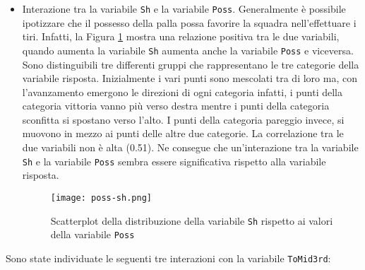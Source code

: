 \begin{itemize}
	\item Interazione tra la variabile \texttt{Sh} e la variabile \texttt{Poss}. Generalmente è possibile ipotizzare che il possesso della palla possa favorire la squadra nell’effettuare i tiri. Infatti, la Figura \ref{fig:shposs} mostra una relazione positiva tra le due variabili, quando aumenta la variabile \texttt{Sh} aumenta anche la variabile \texttt{Poss} e viceversa. Sono distinguibili tre differenti gruppi che rappresentano le tre categorie della variabile risposta. Inizialmente i vari punti sono mescolati tra di loro ma, con l'avanzamento emergono le direzioni di ogni categoria infatti, i punti della categoria vittoria vanno più verso destra mentre i punti della categoria sconfitta si spostano verso l'alto. I punti della categoria pareggio invece, si muovono in mezzo ai punti delle altre due categorie. La correlazione tra le due variabili non è alta (0.51). Ne consegue che un'interazione tra la variabile \texttt{Sh} e la variabile \texttt{Poss} sembra essere significativa rispetto alla variabile risposta.
	\begin{figure}[htbp]
		\begin{center}
			\texttt{[image: poss-sh.png]}
			\caption{Scatterplot della distribuzione della variabile \texttt{Sh} rispetto ai valori della variabile \texttt{Poss}}  \label{fig:shposs}
		\end{center}
	\end{figure}
\end{itemize}
Sono state individuate le seguenti tre interazioni con la variabile \texttt{ToMid3rd}:
